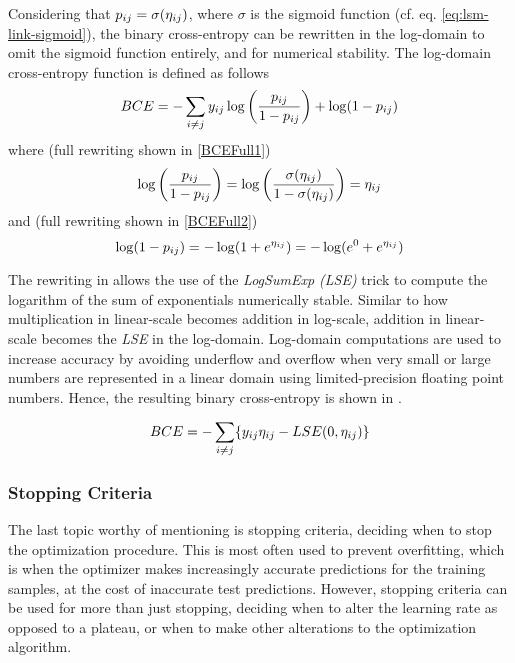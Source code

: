         Considering that $\sub(p)=\sigma(\sub(\eta))$, where $\sigma$ is the sigmoid function (cf. eq. \ref{eq:lsm-link-sigmoid}), the binary cross-entropy can be rewritten in the log-domain to omit the sigmoid function entirely, and for numerical stability. The log-domain cross-entropy function is defined as follows
        \begin{equation}\label{eq:bce-log-domain}
            BCE = -\sum_{i\neq j} \sub(y)\log\left(\frac{\sub(p)}{1-\sub(p)}\right) + \log(1-\sub(p))
        \end{equation}
        where (full rewriting shown in \cref{BCEFull1})
        \begin{equation}\label{eq:bce-rewrite-first}
            \log\left(\frac{\sub(p)}{1-\sub(p)}\right) =
            \log\left(\frac{\sigma(\sub(\eta))}{1-\sigma(\sub(\eta))}\right) = \sub(\eta)
        \end{equation}
        and (full rewriting shown in \cref{BCEFull2})
        \begin{equation}\label{eq:bce-rewrite-second}
            \log(1-\sub(p))=-\log(1+e^{\sub(\eta)})=-\log(e^0+e^{\sub(\eta)})
        \end{equation}
        
        The rewriting in  allows the use of the \emph{LogSumExp (LSE)} trick to compute the logarithm of the sum of exponentials numerically stable. Similar to how multiplication in linear-scale becomes addition in log-scale, addition in linear-scale becomes the \emph{LSE} in the log-domain. Log-domain computations are used to increase accuracy by avoiding underflow and overflow when very small or large numbers are represented in a linear domain using limited-precision floating point numbers. Hence, the resulting binary cross-entropy is shown in .
        
        \begin{equation}\label{eq:bce-log-domain-rewrite}
            BCE = -\sum_{i\neq j}\{ \sub(y) \sub(\eta) - LSE(0,\sub(\eta)) \}
        \end{equation}
    
    \subsubsection{Stopping Criteria}
    
        The last topic worthy of mentioning is stopping criteria, deciding when to stop the optimization procedure. This is most often used to prevent overfitting, which is when the optimizer makes increasingly accurate predictions for the training samples, at the cost of inaccurate test predictions. However, stopping criteria can be used for more than just stopping, deciding when to alter the learning rate as opposed to a plateau, or when to make other alterations to the optimization algorithm. 
        
